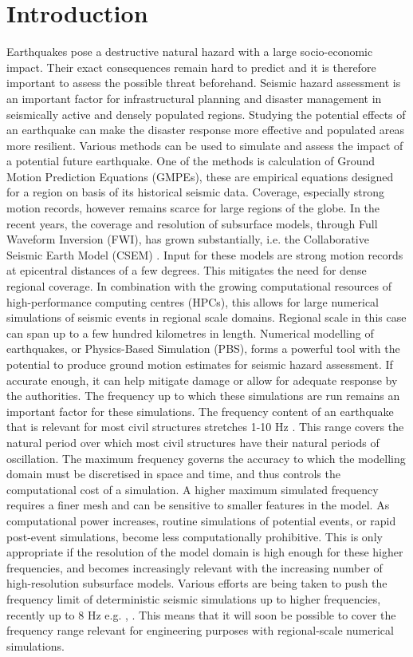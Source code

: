 \documentclass[../Text/00main.tex]{subfiles}
\begin{document}
\section*{Introduction}
Earthquakes pose a destructive natural hazard with a large socio-economic impact. Their exact consequences remain hard to predict and it is therefore important to assess the possible threat beforehand. Seismic hazard assessment is an important factor for infrastructural planning and disaster management in seismically active and densely populated regions. Studying the potential effects of an earthquake can make the disaster response more effective and populated areas more resilient. Various methods can be used to simulate and assess the impact of a potential future earthquake. One of the methods is calculation of Ground Motion Prediction Equations (GMPEs),  these are empirical equations designed for a region on basis of its historical seismic data. Coverage, especially strong motion records, however remains scarce for large regions of the globe. In the recent years, the coverage and resolution of subsurface models, through Full Waveform Inversion (FWI), has grown substantially, i.e. the Collaborative Seismic Earth Model (CSEM) \citep{afanasiev2016foundations}. Input for these models are strong motion records at epicentral distances of a few degrees. This mitigates the need for dense regional coverage. In combination with the growing computational resources of high-performance computing centres (HPCs), this allows for large numerical simulations of seismic events in regional scale domains. Regional scale in this case can span up to a few hundred kilometres in length. Numerical modelling of earthquakes, or Physics-Based Simulation (PBS), forms a powerful tool with the potential to produce ground motion estimates for seismic hazard assessment. If accurate enough, it can help mitigate damage or allow for adequate response by the authorities. The frequency up to which these simulations are run remains an important factor for these simulations.  The frequency content of an earthquake that is relevant for most civil structures stretches 1-10 Hz \citep{chandler1997dynamics}. This range covers the natural period over which most civil structures have their natural periods of oscillation. The maximum frequency governs the accuracy to which the modelling domain must be discretised in space and time, and thus controls the computational cost of a simulation. A higher maximum simulated frequency requires a finer mesh and can be sensitive to smaller features in the model. As computational power increases, routine simulations of potential events, or rapid post-event simulations, become less computationally prohibitive. This is only appropriate if the resolution of the model domain is high enough for these higher frequencies, and becomes increasingly relevant with the increasing number of high-resolution subsurface models. Various efforts are being taken to push the frequency limit of deterministic seismic simulations up to higher frequencies, recently up to 8 Hz e.g. \citet{rodgers_broadband_2019}, \citet{he2015simulation}. This means that it will soon be possible to cover the frequency range relevant for engineering purposes with regional-scale numerical simulations. 
\end{document}
